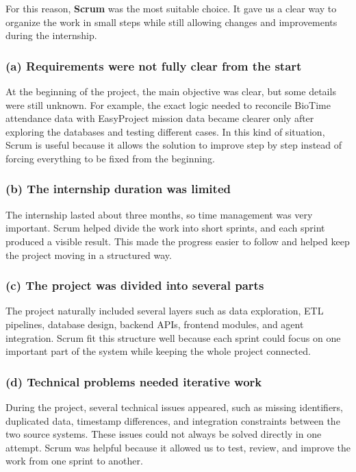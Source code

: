 For this reason, \textbf{Scrum} was the most suitable choice. It gave us a clear way to organize the work in small steps while still allowing changes and improvements during the internship.

\subsubsection{(a) Requirements were not fully clear from the start}
At the beginning of the project, the main objective was clear, but some details were still unknown. For example, the exact logic needed to reconcile BioTime attendance data with EasyProject mission data became clearer only after exploring the databases and testing different cases. In this kind of situation, Scrum is useful because it allows the solution to improve step by step instead of forcing everything to be fixed from the beginning.

\subsubsection{(b) The internship duration was limited}
The internship lasted about three months, so time management was very important. Scrum helped divide the work into short sprints, and each sprint produced a visible result. This made the progress easier to follow and helped keep the project moving in a structured way.

\subsubsection{(c) The project was divided into several parts}
The project naturally included several layers such as data exploration, ETL pipelines, database design, backend APIs, frontend modules, and agent integration. Scrum fit this structure well because each sprint could focus on one important part of the system while keeping the whole project connected.

\subsubsection{(d) Technical problems needed iterative work}
During the project, several technical issues appeared, such as missing identifiers, duplicated data, timestamp differences, and integration constraints between the two source systems. These issues could not always be solved directly in one attempt. Scrum was helpful because it allowed us to test, review, and improve the work from one sprint to another.

